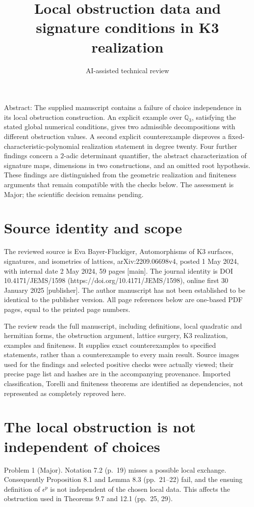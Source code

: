 \documentclass[10pt]{article}
\title{Local obstruction data and signature conditions in K3 realization}
\author{AI-assisted technical review}
\date{}
\begin{document}
\maketitle
Abstract: The supplied manuscript contains a failure of choice independence in its local obstruction construction. An explicit example over \(\mathbb Q_3\), satisfying the stated global numerical conditions, gives two admissible decompositions with different obstruction values. A second explicit counterexample disproves a fixed-characteristic-polynomial realization statement in degree twenty. Four further findings concern a \(2\)-adic determinant quantifier, the abstract characterization of signature maps, dimensions in two constructions, and an omitted root hypothesis. These findings are distinguished from the geometric realization and finiteness arguments that remain compatible with the checks below. The assessment is Major; the scientific decision remains pending.\par
\section*{Source identity and scope}
The reviewed source is Eva Bayer-Fluckiger, Automorphisms of K3 surfaces, signatures, and isometries of lattices, arXiv:2209.06698v4, posted 1 May 2024, with internal date 2 May 2024, 59 pages [main]. The journal identity is DOI 10.4171/JEMS/1598 (https://doi.org/10.4171/JEMS/1598), online first 30 January 2025 [publisher]. The author manuscript has not been established to be identical to the publisher version. All page references below are one-based PDF pages, equal to the printed page numbers.\par
The review reads the full manuscript, including definitions, local quadratic and hermitian forms, the obstruction argument, lattice surgery, K3 realization, examples and finiteness. It supplies exact counterexamples to specified statements, rather than a counterexample to every main result. Source images used for the findings and selected positive checks were actually viewed; their precise page list and hashes are in the accompanying provenance. Imported classification, Torelli and finiteness theorems are identified as dependencies, not represented as completely reproved here.\par
\section*{The local obstruction is not independent of choices}
Problem 1 (Major).  Notation 7.2 (p. 19) misses a possible local exchange. Consequently Proposition 8.1 and Lemma 8.3 (pp. 21–22) fail, and the ensuing definition of \(\epsilon^p\) is not independent of the chosen local data. This affects the obstruction used in Theorems 9.7 and 12.1 (pp. 25, 29).\par
\end{document}
